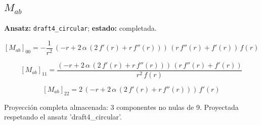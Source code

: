\documentclass[11pt]{article}
\begin{document}
\subsection*{$ M_{ab} $}
\textbf{Ansatz:} \texttt{draft4\_circular}; \textbf{estado:} completada.\par
\begin{dmath*}[breakdepth={5}]
\left[M_{ab}\right]_{00} = -\frac{1}{{r}^{2}}\,\left(-r + 2\,\alpha\,\left(2\,f'\!\left(r\right) + r\,f''\!\left(r\right)\right)\right)\,\left(r\,f''\!\left(r\right) + f'\!\left(r\right)\right)\,f\!\left(r\right)
\end{dmath*}
\par\smallskip
\begin{dmath*}[breakdepth={5}]
\left[M_{ab}\right]_{11} = \frac{\left(-r + 2\,\alpha\,\left(2\,f'\!\left(r\right) + r\,f''\!\left(r\right)\right)\right)\,\left(r\,f''\!\left(r\right) + f'\!\left(r\right)\right)}{{r}^{2}\,f\!\left(r\right)}
\end{dmath*}
\par\smallskip
\begin{dmath*}[breakdepth={5}]
\left[M_{ab}\right]_{22} = 2\,\left(-r + 2\,\alpha\,\left(2\,f'\!\left(r\right) + r\,f''\!\left(r\right)\right)\right)\,f'\!\left(r\right)
\end{dmath*}
\par\smallskip
Proyección completa almacenada: 3 componentes no nulas de 9. Proyectada respetando el ansatz 'draft4\_circular'.\par\medskip
{}
\end{document}
